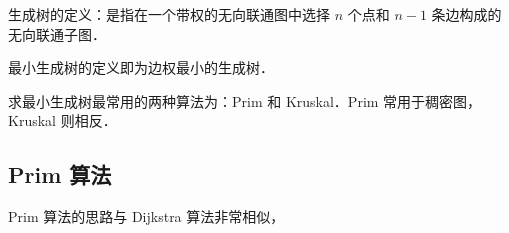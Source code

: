 
\begin{issues}
\issueMissDepend
\end{issues}

生成树的定义：是指在一个带权的无向联通图中选择 $n$ 个点和 $n - 1$ 条边构成的无向联通子图．

最小生成树的定义即为边权最小的生成树．

求最小生成树最常用的两种算法为：Prim 和 Kruskal．Prim 常用于稠密图，Kruskal 则相反．

\subsection{Prim 算法}

Prim 算法的思路与 Dijkstra 算法非常相似，